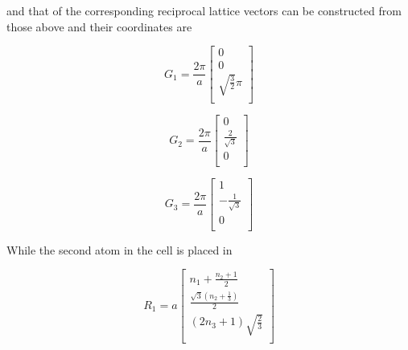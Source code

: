 \documentclass[a4paper]{article}
\begin{document}
and that of the corresponding reciprocal lattice vectors can be constructed from those above and their coordinates are \\
\begin{minipage}{0.3\textwidth}
    \centering
    \begin{equation*}
    G_1 = \frac{2\pi}{a}
    \begin{bmatrix}
        0 \\
        0 \\
        \sqrt{\frac{3}{2}}\pi \\
        
    \end{bmatrix}
    \end{equation*}
    
    \end{minipage}
    \begin{minipage}{0.3\textwidth}
    \centering
    \begin{equation*}
    G_2 = \frac{2\pi}{a}
    \begin{bmatrix}
        0 \\
        \frac{2}{\sqrt{3}}  \\
        0 \\
    \end{bmatrix}
    \end{equation*}
    \end{minipage}
    \begin{minipage}{0.3\textwidth}
    \centering
    \begin{equation*}
    G_3 = \frac{2\pi}{a}
    \begin{bmatrix}
        1 \\
        -\frac{1}{\sqrt{3}}  \\
        0 \\
    \end{bmatrix}
    \end{equation*}
    \end{minipage}

    While the second atom in the cell is placed in
    \begin{minipage}{0.3\textwidth}
        \centering
        \begin{equation*}
        R_1 = a
        \begin{bmatrix}
            n_1 + \frac{n_2 + 1}{2} \\
            \frac{\sqrt{3}(n_2 + \frac{1}{3})}{2} \\
            (2n_3 + 1)\sqrt{\frac{2}{3}} \\
            
        \end{bmatrix}
        \end{equation*}
        
        \end{minipage}
        
\end{document}
